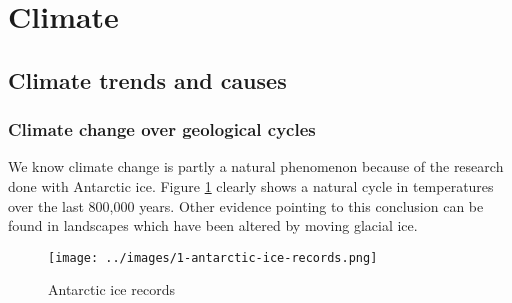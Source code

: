 \documentclass[../summary.tex]{subfiles}
\begin{document}
	
	\section{Climate}
		\subsection{Climate trends and causes}
			\subsubsection{Climate change over geological cycles}
				We know climate change is partly a natural phenomenon because of the research done with Antarctic ice. Figure \ref{fig:1-antarctic-ice-records} clearly shows a natural cycle in temperatures over the last 800,000 years. Other evidence pointing to this conclusion can be found in landscapes which have been altered by moving glacial ice.
				\begin{figure}[h]
					\centering
					\texttt{[image: ../images/1-antarctic-ice-records.png]}
					\caption{Antarctic ice records}
					\label{fig:1-antarctic-ice-records}
				\end{figure}
			
\end{document}
